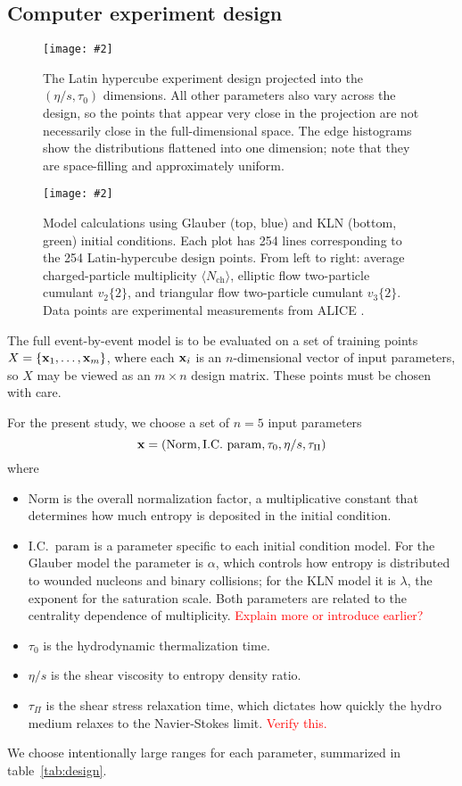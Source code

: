 \documentclass[aps,prc,reprint,superscriptaddress,amsmath]{revtex4-1}
\newcommand{\todo}[1]{\textcolor{red}{#1}}
\newcommand{\colfig}[3][t]{
  \begin{figure}[#1]
    \texttt{[image: \#2]}
    \caption{\label{fig:#2}#3}
  \end{figure}
}
\newcommand{\widefig}[3][t]{
  \begin{figure*}[#1]
    \texttt{[image: \#2]}
    \caption{\label{fig:#2}#3}
  \end{figure*}
}
\newcommand{\avg}[1]{\langle #1 \rangle}
\newcommand{\nch}{N_\text{ch}}
\newcommand{\vnk}[2]{v_#1\{#2\}}
\begin{document}
\subsection{Computer experiment design}

\colfig[b]{design}{
  The Latin hypercube experiment design projected into the $(\eta/s, \tau_0)$ dimensions.
  All other parameters also vary across the design, so the points that appear very close in the projection are not necessarily close in the full-dimensional space.
  The edge histograms show the distributions flattened into one dimension; note that they are space-filling and approximately uniform.
}

\widefig{prior_draws}{
  Model calculations using Glauber (top, blue) and KLN (bottom, green) initial conditions.
  Each plot has 254 lines corresponding to the 254 Latin-hypercube design points.
  From left to right:
  average charged-particle multiplicity $\avg\nch$,
  elliptic flow two-particle cumulant $\vnk 2 2$,
  and triangular flow two-particle cumulant $\vnk 3 2$.
  Data points are experimental measurements from ALICE \cite{Abelev:2014mda}.
}

The full event-by-event model is to be evaluated on a set of training points $X = \{\mathbf x_1, \ldots, \mathbf x_m\}$, where each $\mathbf x_i$ is an $n$-dimensional vector of input parameters, so $X$ may be viewed as an $m \times n$ design matrix.
These points must be chosen with care.

For the present study, we choose a set of $n = 5$ input parameters
\begin{equation}
  \mathbf x = (\text{Norm}, \text{I.C.\ param}, \tau_0, \eta/s, \tau_\Pi)
\end{equation}
where
\begin{itemize}
  \item Norm is the overall normalization factor, a multiplicative constant that determines how much entropy is deposited in the initial condition.
  \item I.C.\ param is a parameter specific to each initial condition model.
    For the Glauber model the parameter is $\alpha$, which controls how entropy is distributed to wounded nucleons and binary collisions;
    for the KLN model it is $\lambda$, the exponent for the saturation scale.
    Both parameters are related to the centrality dependence of multiplicity.
    \todo{Explain more or introduce earlier?}
  \item $\tau_0$ is the hydrodynamic thermalization time.
  \item $\eta/s$ is the shear viscosity to entropy density ratio.
  \item $\tau_\Pi$ is the shear stress relaxation time, which dictates how quickly the hydro medium relaxes to the Navier-Stokes limit.
    \todo{Verify this.}
\end{itemize}
We choose intentionally large ranges for each parameter, summarized in table~\ref{tab:design}.
\end{document}
